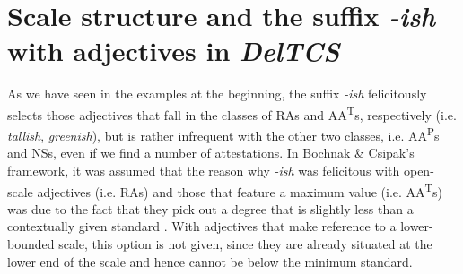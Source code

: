 \documentclass[output=paper]{langsci/langscibook}
\begin{document}
\section{Scale structure and the suffix \textit{-ish} with adjectives in \textit{DelTCS}}
\label{scale-ish-deltcs}

As we have seen in the examples at the beginning, the suffix \textit{-ish} felicitously selects those adjectives that fall in the classes of RAs and AA\textsuperscript{T}s, respectively (i.e. \textit{tallish}, \textit{greenish}), but is rather infrequent with the other two classes, i.e. AA\textsuperscript{P}s and NSs, even if we find a number of attestations.
In Bochnak \& Csipak's \citeyearpar{Bochnak2014} framework, it was assumed that the reason why \textit{-ish} was felicitous with open-scale adjectives (i.e. RAs) and those that feature a maximum value (i.e. AA\textsuperscript{T}s) was due to the fact that they pick out a degree that is slightly less than a contextually given standard \citeyearpar[436]{Bochnak2014}. With adjectives that make reference to a lower-bounded scale, this option is not given, since they are already situated at the lower end of the scale and hence cannot be below the minimum standard.
\end{document}
